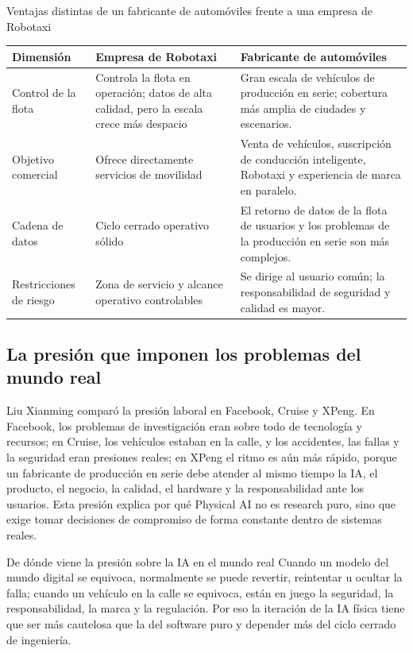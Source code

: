 \documentclass[a4paper]{article}
\begin{document}
\begin{knowledgebox}{Ventajas distintas de un fabricante de automóviles frente a una empresa de Robotaxi}
\begin{tabularx}{\textwidth}{p{}p{}X}
\toprule
Dimensión & Empresa de Robotaxi & Fabricante de automóviles \\
\midrule
Control de la flota & Controla la flota en operación; datos de alta calidad, pero la escala crece más despacio & Gran escala de vehículos de producción en serie; cobertura más amplia de ciudades y escenarios. \\
Objetivo comercial & Ofrece directamente servicios de movilidad & Venta de vehículos, suscripción de conducción inteligente, Robotaxi y experiencia de marca en paralelo. \\
Cadena de datos & Ciclo cerrado operativo sólido & El retorno de datos de la flota de usuarios y los problemas de la producción en serie son más complejos. \\
Restricciones de riesgo & Zona de servicio y alcance operativo controlables & Se dirige al usuario común; la responsabilidad de seguridad y calidad es mayor. \\
\bottomrule
\end{tabularx}
\end{knowledgebox}

\subsection{La presión que imponen los problemas del mundo real}

Liu Xianming comparó la presión laboral en Facebook, Cruise y XPeng. En Facebook, los problemas de investigación eran sobre todo de tecnología y recursos; en Cruise, los vehículos estaban en la calle, y los accidentes, las fallas y la seguridad eran presiones reales; en XPeng el ritmo es aún más rápido, porque un fabricante de producción en serie debe atender al mismo tiempo la IA, el producto, el negocio, la calidad, el hardware y la responsabilidad ante los usuarios. Esta presión explica por qué Physical AI no es research puro, sino que exige tomar decisiones de compromiso de forma constante dentro de sistemas reales.

\begin{warningbox}{De dónde viene la presión sobre la IA en el mundo real}
Cuando un modelo del mundo digital se equivoca, normalmente se puede revertir, reintentar u ocultar la falla; cuando un vehículo en la calle se equivoca, están en juego la seguridad, la responsabilidad, la marca y la regulación. Por eso la iteración de la IA física tiene que ser más cautelosa que la del software puro y depender más del ciclo cerrado de ingeniería.
\end{warningbox}
\end{document}
